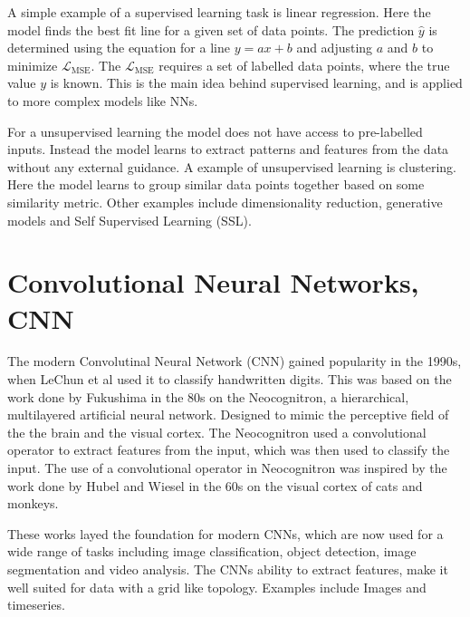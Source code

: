 A simple example of a supervised learning task is linear regression. Here the model finds the best fit line for a given set of data points. The prediction $\hat{y}$ is determined using the equation for a line $y = ax + b$ and adjusting $a$ and $b$ to minimize $\mathcal{L}_{\text{MSE}}$.
The $\mathcal{L}_{\text{MSE}}$ requires a set of labelled data points, where the true value $y$ is known. This is the main idea behind supervised learning, and is applied to more complex models like NNs.

For a unsupervised learning the model does not have access to pre-labelled inputs. Instead the model learns to extract patterns and features from the data without any external guidance.
A example of unsupervised learning is clustering. Here the model learns to group similar data points together based on some similarity metric. Other examples include dimensionality reduction, generative models and Self Supervised Learning (SSL).

\section{Convolutional Neural Networks, CNN}


The modern Convolutinal Neural Network (CNN) gained popularity in the 1990s, when LeChun et al\cite{LeChun} used it to classify handwritten digits. This was based on the work done by Fukushima in the 80s\cite{Fukushima} on the Neocognitron, a hierarchical, multilayered artificial neural network.
Designed to mimic the perceptive field of the the brain and the visual cortex. The Neocognitron used a convolutional operator to extract features from the input, which was then used to classify the input.
The use of a convolutional operator in Neocognitron was inspired by the work done by Hubel and Wiesel in the 60s\cite{HubelWiesel} on the visual cortex of cats and monkeys.

These works layed the foundation for modern CNNs, which are now used for a wide range of tasks including image classification, object detection, image segmentation and video analysis. 
The CNNs ability to extract features, make it well suited for data with a grid like topology. Examples include Images and timeseries. 

